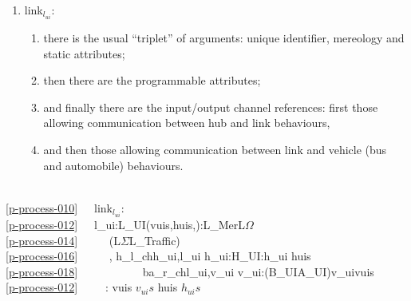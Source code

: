 {\begin{enumerate}\setei
\item \label{p-process-010} \textsf{link${_{l_{ui}}}$}:
\begin{enumerate}
\item \label{p-process-012} there is the usual ``triplet'' of arguments:
                          unique identifier, mereology and static
                          attributes;
\item \label{p-process-014} then there are the programmable attributes;
\item \label{p-process-016} and finally there are the input/output channel references:
                          first those allowing communication between
                          hub and link behaviours, 
\item \label{p-process-018} and then those  allowing communication between
                          link and vehicle (bus and automobile) behaviours.
\end{enumerate}
\savei\end{enumerate}\footsize\sf\HHHH
\pos{\psno}{\mnewfoil}
\bp
{}\\
\ref{p-process-010}\ \ \ link$_{l_{ui}}$:\\
\ref{p-process-012}\ \ \ l\_ui:L\_UI{\TIMES}(vuis,huis,{\UNDERLINE}):L\_Mer{\TIMES}L$\Omega$\\
\ref{p-process-014}\ \ \ \ \ {\RIGHTARROW} (L$\Sigma${\TIMES}L\_Traffic)\\
\ref{p-process-016}\ \ \ \ \ {\RIGHTARROW} , {\LBRACE} h\_l\_ch{\LBRACKET}h\_ui,l\_ui{\RBRACKET} {\BAR} h\_ui:H\_UI:h\_ui {\ISIN} huis {\RBRACE}\\
\ref{p-process-018}\ \ \ \ \ \ \ \ \ \ \ {\LBRACE} ba\_r\_ch{\LBRACKET}l\_ui,v\_ui{\RBRACKET} {\BAR} v\_ui:(B\_UI{\BAR}A\_UI){\RDOT}v\_ui{\ISIN}vuis {\RBRACE} \\
\ref{p-process-012}\ \ \ \ \ : vuis {\EQ} $v_{ui}s$ {\WEDGE} huis {\EQ} $h_{ui}s$
\ep
\pos{\psno}{\mnewfoil}

}
